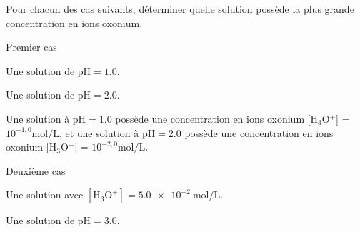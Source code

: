 \hauteurLargeurCadreReponse		{6mm}{12mm}
\initialisationEntrainement

Pour chacun des cas suivants, déterminer quelle solution possède la plus grande concentration en ions oxonium.

\debutEntrainement



\begin{enonce}
Premier cas
\begin{listeQCM2Colonnes}
	\item Une solution de $\text{pH}=\num{1,0}$.
	\item Une solution de $\text{pH}=\num{2,0}$.
\end{listeQCM2Colonnes}
\end{enonce}
\reponse{\reponseA}
\begin{corrige}
Une solution à $\text{pH}=\num{1,0}$ possède une concentration en ions oxonium [H$_3$O$^+$] = $10^{-1,0}\si{\mole\per\liter}$, et une solution à $\text{pH}=\num{2,0}$ possède une concentration en ions oxonium [H$_3$O$^+$] = $10^{-2,0}\si{\mole\per\liter}$.
\end{corrige}




\begin{enonce}
Deuxième cas
\begin{listeQCM2Colonnes}
	\item Une solution avec $[\mathrm{H_3O^+}]=\SI{5,0e-2}{\mole\per\liter}$.
	\item Une solution de $\text{pH}=\num{3,0}$.
\end{listeQCM2Colonnes}
\end{enonce}

